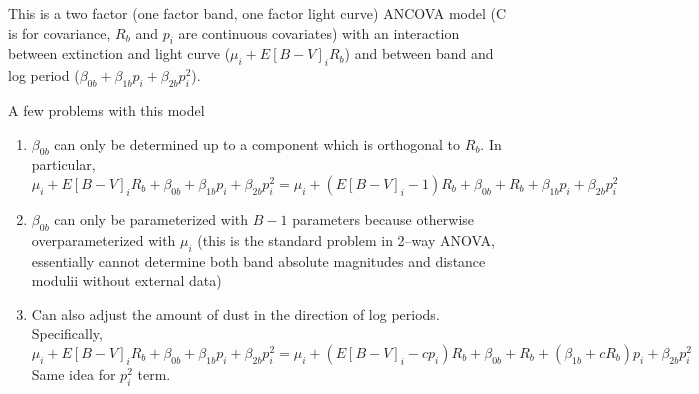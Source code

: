 \documentclass[12pt]{article}
\begin{document}
This is a two factor (one factor band, one factor light curve) ANCOVA model (C is for covariance, $R_b$ and $p_i$ are continuous covariates) with an interaction between extinction and light curve ($\mu_i + E[B-V]_iR_b$) and between band and log period ($\beta_{0b} + \beta_{1b}p_i + \beta_{2b}p_i^2$).

A few problems with this model
\begin{enumerate}
\item $\beta_{0b}$ can only be determined up to a component which is orthogonal to $R_b$. In particular,
  \begin{equation*}
    \mu_i + E[B-V]_iR_b + \beta_{0b} + \beta_{1b}p_i + \beta_{2b}p_i^2 = \mu_i + (E[B-V]_i-1)R_b + \beta_{0b} + R_{b} + \beta_{1b}p_i + \beta_{2b}p_i^2
    \end{equation*}
\item $\beta_{0b}$ can only be parameterized with $B-1$ parameters because otherwise overparameterized with $\mu_i$ (this is the standard problem in 2--way ANOVA, essentially cannot determine both band absolute magnitudes and distance modulii without external data)
\item Can also adjust the amount of dust in the direction of log periods. Specifically,
  \begin{equation*}
    \mu_i + E[B-V]_iR_b + \beta_{0b} + \beta_{1b}p_i + \beta_{2b}p_i^2 = \mu_i + (E[B-V]_i-cp_i)R_b + \beta_{0b} + R_{b} + (\beta_{1b}+cR_b)p_i + \beta_{2b}p_i^2
  \end{equation*}
  Same idea for $p_i^2$ term.
\end{enumerate}
\end{document}
